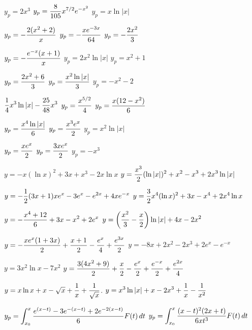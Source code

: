 \medskip

  $y_{p}=2x^{3}$
 $y_{p}=\displaystyle\frac{8}{105}x^{7/2}e^{-x^{2}}$
 $y_{p}=x\ln|x|$

 $y_{p}=\displaystyle{-\frac{2(x^{2}+2)}{x}}$
 $y_{p}=\displaystyle{-\frac{xe^{-3x}}{64}}$
 $y_{p}=-\displaystyle\frac{2x^{2}}{3}$

 $y_{p}=-\displaystyle\frac{e^{-x}(x+1)}{x}$
 $y_{p}=2x^{2}\ln|x|$
 $y_{p}=x^{2}+1$

 $y_{p}=\displaystyle\frac{2x^{2}+6}{3}$
 $y_{p}=\displaystyle\frac{x^{2}\ln|x|}{3}$
 $y_{p}=-x^{2}-2$

  $\displaystyle{\frac{1}{4}x^{3}
\ln|x|-\frac{25}{48}x^{3}}$
 $y_{p}=\displaystyle\frac{x^{5/2}}{4}$
 $y_{p}=\displaystyle\frac{x(12-x^{2})}{6}$

 $y_{p}=\displaystyle\frac{x^{4}\ln|x|}{6}$
 $y_{p}=\displaystyle\frac{x^{3}e^{x}}{2}$
 $y_{p}=x^{2}\ln|x|$

 $y_{p}=\displaystyle\frac{xe^{x}}{2}$
 $y_{p}=\displaystyle\frac{3xe^{x}}{2}$
  $y_{p}=-x^{3}$

 $y=-x(\ln x)^{2}+3x+x^{3}-2x\ln x$
 $y=\displaystyle\frac{x^{3}}{2}(\ln
|x|)^{2}+x^{2}-x^{3}+2x^{3}\ln|x|$

   $y=\displaystyle{-\frac{1}{2}(3x+1)xe^{x}-3e^{x}-e^{2x}
+4xe^{-x}}$
 $y=\displaystyle{\frac{3}{2}x^{4}(\ln
x)^{2}+3x-x^{4}+2x^{4}\ln x}$

 $y=\displaystyle{-\frac{x^{4}+12}{6}+3x-x^{2}+2e^{x}}$
$y=\displaystyle{\left(\frac{x^{2}}{3}-\frac{x}{2}\right)\ln|x|+4x-2x^{2}}$

$y=\displaystyle{-\frac{xe^{x}(1+3x)}{2}+\frac{x+1}{2}-\frac{e^{x}}{4}+\frac{e^{3x}}{2}}$
 $y=-8x+2x^{2}-2x^{3}+2e^{x}-e^{-x}$

 $y=3x^{2}\ln x-7x^{2}$
$y=\displaystyle{\frac{3(4x^{2}+9)}{2}+\frac{x}{2}-\frac{e^{x}}{2}+\frac{e^{-x}}{2}+\frac{e^{2x}}{4}}$

$y=x\ln x+x-\sqrt{x}+\displaystyle\frac{1}{x}+\frac{1}{\sqrt{x}}$.
  $y=\displaystyle{x^{3}\ln|x|+x-2x^{3}+\frac{1}{x}-\frac{1}{x^{2}}}$

$y_{p}=\displaystyle{\int_{x_{0}}^{x}\frac{e^{(x-t)}-3e^{-(x-t)}+2e^{-2(x-t)}}{6}
F(t)\,dt}$
$y_{p}=\displaystyle{\int_{x_{0}}^{x}\frac{(x-t)^{2}(2x+t)}{6xt^{3}}
F(t)\,dt}$

